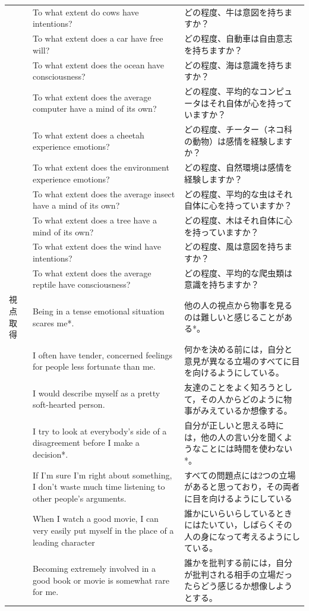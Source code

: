 \documentclass[a4j,12pt]{jreport}
\begin{document}
\begin{center}
{\begin{longtable}{lp{5cm}p{5cm}}
&To what extent do cows have intentions?&どの程度、牛は意図を持ちますか？\\
&To what extent does a car have free will?&どの程度、自動車は自由意志を持ちますか？\\
&To what extent does the ocean have consciousness?&どの程度、海は意識を持ちますか？\\
&To what extent does the average computer have a mind of its own?&どの程度、平均的なコンピュータはそれ自体が心を持っていますか？\\
&To what extent does a cheetah experience emotions?&どの程度、チーター（ネコ科の動物）は感情を経験しますか？\\
&To what extent does the environment experience emotions?&どの程度、自然環境は感情を経験しますか？\\
&To what extent does the average insect have a mind of its own?&どの程度、平均的な虫はそれ自体に心を持っていますか？\\
&To what extent does a tree have a mind of its own?&どの程度、木はそれ自体に心を持っていますか？\\
&To what extent does the wind have intentions?&どの程度、風は意図を持ちますか？\\
&To what extent does the average reptile have consciousness?&どの程度、平均的な爬虫類は意識を持ちますか？\\
視点取得&Being in a tense emotional situation scares me*.&他の人の視点から物事を見るのは難しいと感じることがある*。\\
&I often have tender, concerned feelings for people less fortunate than me.&何かを決める前には，自分と意見が異なる立場のすべてに目を向けるようにしている。\\
&I would describe myself as a pretty soft-hearted person.&友達のことをよく知ろうとして，その人からどのように物事がみえているか想像する。\\
&I try to look at everybody's side of a disagreement before I make a decision*.&自分が正しいと思える時には，他の人の言い分を聞くようなことには時間を使わない*。\\
&If I'm sure I'm right about something, I don't waste much time listening to other people's arguments.&すべての問題点には2つの立場があると思っており，その両者に目を向けるようにしている\\
&When I watch a good movie, I can very easily put myself in the place of a leading character&誰かにいらいらしているときにはたいてい，しばらくその人の身になって考えるようにしている。\\
&Becoming extremely involved in a good book or movie is somewhat rare for me.&誰かを批判する前には，自分が批判される相手の立場だったらどう感じるか想像しようとする。\\

\end{longtable}}
\end{center}
\end{document}

